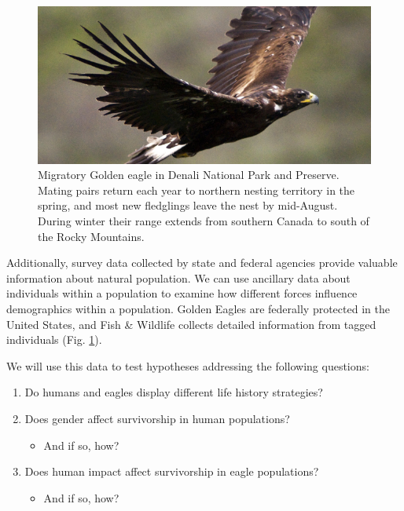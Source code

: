 \documentclass[]{book}
\providecommand{\tightlist}{%
  \setlength{\itemsep}{0pt}\setlength{\parskip}{0pt}}
\begin{document}
\begin{figure}
\centering
\includegraphics{chapter_materials/population_ecology/golden_eagle.jpg}
\caption{\label{fig:eagle-fig}Migratory Golden eagle in Denali National Park and Preserve. Mating pairs return each year to northern nesting territory in the spring, and most new fledglings leave the nest by mid-August. During winter their range extends from southern Canada to south of the Rocky Mountains\citep{brown_patterns_2017}.}
\end{figure}

Additionally, survey data collected by state and federal agencies provide valuable information about natural population. We can use ancillary data about individuals within a population to examine how different forces influence demographics within a population. Golden Eagles are federally protected in the United States, and Fish \& Wildlife collects detailed information from tagged individuals (Fig. \ref{fig:eagle-fig}).

We will use this data to test hypotheses addressing the following questions:

\begin{enumerate}
\def\labelenumi{\arabic{enumi}.}
\tightlist
\item
  Do humans and eagles display different life history strategies?
\item
  Does gender affect survivorship in human populations?

  \begin{itemize}
  \tightlist
  \item
    And if so, how?
  \end{itemize}
\item
  Does human impact affect survivorship in eagle populations?

  \begin{itemize}
  \tightlist
  \item
    And if so, how?
  \end{itemize}
\end{enumerate}
\end{document}
